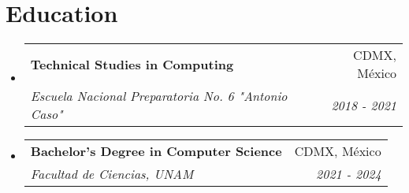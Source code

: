 \documentclass[letterpaper,11pt]{article}
\makeatletter
\newcommand{\resumeItem}[1]{
  \item\small{
    {#1 \vspace{-2pt}}
  }
}
\newcommand{\resumeSubheading}[4]{
  \vspace{-2pt}\item
    \begin{tabular*}{0.97\textwidth}[t]{l@{\extracolsep{\fill}}r}
      \textbf{#1} & #2 \\
      \textit{\small#3} & \textit{\small #4} \\
    \end{tabular*}\vspace{-7pt}
}
\newcommand{\resumeProjectHeading}[2]{
    \item
    \begin{tabular*}{0.97\textwidth}{l@{\extracolsep{\fill}}r}
      \small#1 & #2 \\
    \end{tabular*}\vspace{-7pt}
}
\newcommand{\resumeSubHeadingListStart}{\begin{itemize}[leftmargin=0.15in, label={}]}
\newcommand{\resumeSubHeadingListEnd}{\end{itemize}}
\newcommand{\resumeItemListStart}{\begin{itemize}}
\newcommand{\resumeItemListEnd}{\end{itemize}\vspace{-5pt}}
\makeatother
\begin{document}


\section{Education}
  \resumeSubHeadingListStart
    \resumeSubheading
      {Technical Studies in Computing}{CDMX, México}
      {Escuela Nacional Preparatoria No. 6 "Antonio Caso"}{2018 - 2021}
      \resumeSubheading
      {Bachelor's Degree in Computer Science}{CDMX, México}
      {Facultad de Ciencias, UNAM}{2021 - 2024}
  \resumeSubHeadingListEnd

\end{document}
